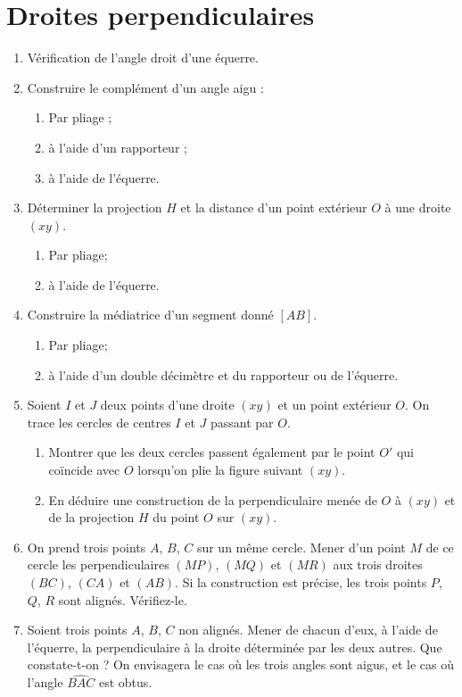 \documentclass[12 pt]{report}
\theoremstyle{plain}
\newcounter{n}
\begin{document}
\chapter{Droites perpendiculaires} 
\begin{enumerate}
\item Vérification de l'angle droit d'une équerre.
\item Construire le complément d'un angle aigu : \begin{enumerate}
\item Par pliage ; 
\item à l'aide d'un rapporteur ; 
\item à l'aide de l'équerre.
\end{enumerate}
\item Déterminer la projection $H$ et la distance d'un point extérieur $O$ à une droite $(xy)$. \begin{enumerate}
\item Par pliage; \item à l'aide de l'équerre.
\end{enumerate}
\item Construire la médiatrice d'un segment donné $[AB]$. \begin{enumerate}
\item Par pliage; \item à l'aide d'un double décimètre et du rapporteur ou de l'équerre.
\end{enumerate}
\item Soient $I$ et $J$ deux points d'une droite $(xy)$ et un point extérieur $O$.
On trace les cercles de centres $I$ et $J$ passant par $O$. \begin{enumerate}
\item Montrer que les deux cercles passent également par le point $O'$ qui coïncide avec $O$ lorsqu'on plie la figure suivant $(xy)$.
\item En déduire une construction de la perpendiculaire menée de $O$ à $ (xy)$ et de la projection $H$ du point $O$ sur $(xy)$. 
\end{enumerate}
\item On prend trois points $A$, $B$, $C$ sur un même cercle. Mener d'un point $M$ de
ce cercle les perpendiculaires $(MP)$, $(MQ)$ et $(MR)$ aux trois droites $(BC)$, 
$(CA)$ et $(AB)$. Si la construction est précise, les trois points $P$, $Q$, $R$ sont alignés. Vérifiez-le. 
\item Soient trois points $A$, $B$, $C$ non alignés. Mener de chacun d'eux, à l'aide
de l'équerre, la perpendiculaire à la droite déterminée par les deux autres. Que constate-t-on ? On envisagera le cas où les trois angles sont aigus, et le cas où l'angle $\widehat{BAC}$ est obtus.

\end{enumerate}
\end{document}
